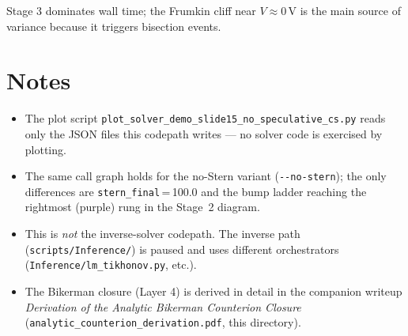 \documentclass[11pt]{article}
\begin{document}
Stage 3 dominates wall time; the Frumkin cliff near $V \approx 0$\,V
is the main source of variance because it triggers bisection events.

\section*{Notes}

\begin{itemize}
\setlength{\itemsep}{2pt}
\item The plot script
  \texttt{plot\_solver\_demo\_slide15\_no\_speculative\_cs.py} reads
  only the JSON files this codepath writes --- no solver code is
  exercised by plotting.
\item The same call graph holds for the no-Stern variant
  (\texttt{-{}-no-stern}); the only differences are
  \texttt{stern\_final}\,=\,100.0 and the bump ladder reaching the
  rightmost (purple) rung in the Stage~2 diagram.
\item This is \emph{not} the inverse-solver codepath.  The inverse
  path (\texttt{scripts/Inference/}) is paused and uses different
  orchestrators (\texttt{Inference/lm\_tikhonov.py}, etc.).
\item The Bikerman closure (Layer 4) is derived in detail in the
  companion writeup
  \emph{Derivation of the Analytic Bikerman Counterion Closure}
  (\texttt{analytic\_counterion\_derivation.pdf}, this directory).
\end{itemize}
\end{document}
